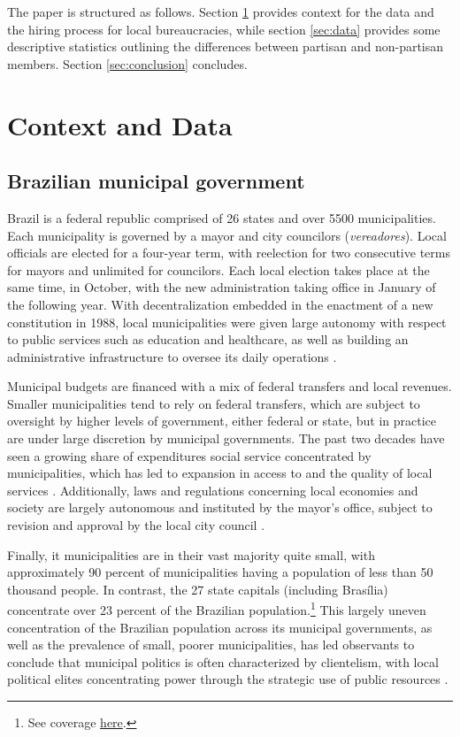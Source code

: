 The paper is structured as follows. Section \ref{sec:context} provides context for the data and the hiring process for local bureaucracies, while section \ref{sec:data} provides some descriptive statistics outlining the differences between partisan and non-partisan members. Section \ref{sec:conclusion} concludes.

\section{Context and Data}
\label{sec:context}

\subsection{Brazilian municipal government}

Brazil is a federal republic comprised of 26 states and over 5500 municipalities. Each municipality is governed by a mayor and city councilors (\emph{vereadores}). Local officials are elected for a four-year term, with reelection for two consecutive terms for mayors and unlimited for councilors. Each local election takes place at the same time, in October, with the new administration taking office in January of the following year. With decentralization embedded in the enactment of a new constitution in 1988, local municipalities were given large autonomy with respect to public services such as education and healthcare, as well as building an administrative infrastructure to oversee its daily operations \citep{souza2017modernizaccao}. 

Municipal budgets are financed with a mix of federal transfers and local revenues. Smaller municipalities tend to rely on federal transfers, which are subject to oversight by higher levels of government, either federal or state, but in practice are under large discretion by municipal governments. The past two decades have seen a growing share of expenditures social service concentrated by municipalities, which has led to expansion in access to and the quality of local services \citep{arretche_trajetorias_2015}. Additionally, laws and regulations concerning local economies and society are largely autonomous and instituted by the mayor's office, subject to revision and approval by the local city council \citep{brelaz2013processo}.

Finally, it municipalities are in their vast majority quite small, with approximately 90 percent of municipalities having a population of less than 50 thousand people. In contrast, the 27 state capitals (including Bras\'{i}lia) concentrate over 23 percent of the Brazilian population.\footnote{See coverage \href{https://www.google.com/search?q=tamanho+municipio+brasil+poulacao&source=lmns&hl=en&sa=X&ved=2ahUKEwjyiLjLh6buAhXFn-AKHbzEBxAQ_AUoAHoECAEQAA}{here}.} This largely uneven concentration of the Brazilian population across its municipal governments, as well as the prevalence of small, poorer municipalities, has led observants to conclude that municipal politics is often characterized by clientelism, with local political elites concentrating power through the strategic use of public resources \citep{leal2012coronelismo}.

